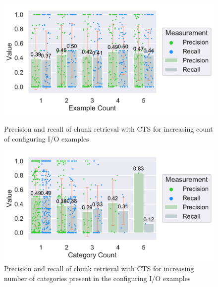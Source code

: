 \documentclass[\myrootdir/main.tex]{subfiles}
\begin{document}
\begin{figure}[htbp]
	\centering
	\begin{minipage}{0.45\textwidth}
		\centering
		\includegraphics[width=\textwidth, clip]{img/big-study/recall-precision-examplecount-TS.pdf}
		\caption{Precision and recall of chunk retrieval with CTS for increasing count of configuring I/O examples}
		\label{fig:recall-precision-examplecount-TS}
	\end{minipage}\hfill
	\begin{minipage}{0.45\textwidth}
		\centering
		\includegraphics[width=\textwidth, clip]{img/big-study/recall-precision-categorycount-TS.pdf}
		\caption{Precision and recall of chunk retrieval with CTS for increasing number of categories present in the configuring I/O examples}
		\label{fig:recall-precision-categorycount-TS}
	\end{minipage}
\end{figure}
\end{document}
